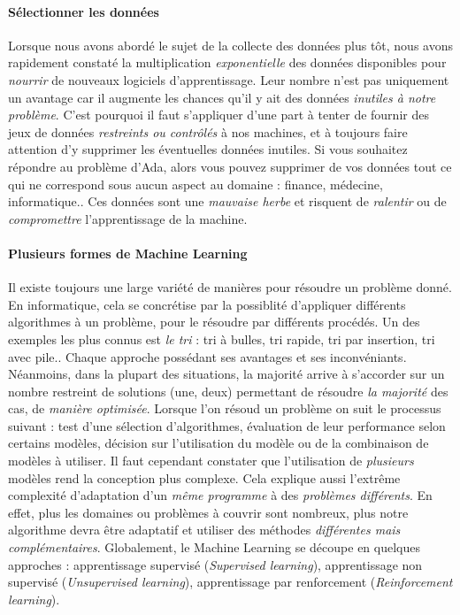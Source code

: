 \paragraph{Sélectionner les données}\label{select_data_ml} Lorsque nous avons abordé le sujet de la collecte des données plus tôt, nous avons rapidement constaté la 
multiplication \emph{exponentielle} des données disponibles pour \emph{nourrir} de nouveaux logiciels d'apprentissage. Leur nombre n'est pas
uniquement un avantage car il augmente les chances qu'il y ait des données \emph{inutiles à notre problème}. C'est pourquoi il faut s'appliquer
d'une part à tenter de fournir des jeux de données \emph{restreints ou contrôlés} à nos machines, et à toujours faire attention d'y supprimer les
éventuelles données inutiles. Si vous souhaitez répondre au problème d'Ada, alors vous pouvez supprimer de vos données tout ce qui ne correspond
sous aucun aspect au domaine : finance, médecine, informatique.. Ces données sont une \emph{mauvaise herbe} et risquent de \emph{ralentir} ou de
\emph{compromettre} l'apprentissage de la machine. 

\paragraph{Plusieurs formes de Machine Learning} Il existe toujours une large variété de manières pour résoudre un problème donné. En informatique, cela se concrétise par la possiblité
d'appliquer différents algorithmes à un problème, pour le résoudre par différents procédés. Un des exemples les plus connus est \emph{le tri} : tri à
bulles, tri rapide, tri par insertion, tri avec pile.. Chaque approche possédant ses avantages et ses inconvéniants. Néanmoins, dans la plupart des
situations, la majorité arrive à s'accorder sur un nombre restreint de solutions (une, deux) permettant de résoudre \emph{la majorité} des cas, de \emph{manière optimisée}.
Lorsque l'on résoud un problème on suit le processus suivant : test d'une sélection d'algorithmes, évaluation de leur performance selon certains
modèles, décision sur l'utilisation du modèle ou de la combinaison de modèles à utiliser. Il faut cependant constater que l'utilisation de \emph{plusieurs}
modèles rend la conception plus complexe. Cela explique aussi l'extrême complexité d'adaptation d'un \emph{même programme} à des \emph{problèmes différents}.
En effet, plus les domaines ou problèmes à couvrir sont nombreux, plus notre algorithme devra être adaptatif et utiliser des méthodes \emph{différentes mais complémentaires}. 
Globalement, le Machine Learning se découpe en quelques approches : apprentissage supervisé (\emph{Supervised learning}), apprentissage non supervisé
(\emph{Unsupervised learning}), apprentissage par renforcement (\emph{Reinforcement learning}).


